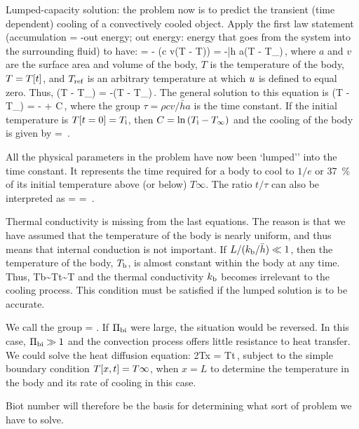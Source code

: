 Lumped-capacity solution: the problem now is to predict the transient (time dependent) cooling of a convectively cooled object. Apply the first law statement (accumulation = -out energy; out energy: energy that goes from the system into the surrounding fluid) to have:
\beq
\dt\ien = -\flux\implies
{}\left(\rho c v\left(T - T\right)\right) = -\bar h a\left(T - T_\infty\right)\,,
\eeq
where $a$ and $v$ are the surface area and volume of the body, $T$ is the temperature of the body, $T = T\!\left[{t}\right]$, and $T_\text{ref}$ is an arbitrary temperature at which $u$ is defined to equal zero. Thus,
\beq
{}\left(T - T_\infty\right) = -\left(T - T_\infty\right)\,.
\eeq
The general solution to this equation is
\beq
\ln\left(T - T_\infty\right) = - + C\,,
\eeq
where the group $\tau = \rho cv/\bar ha$ is the time constant. If the initial temperature is $T\!\left[{t = 0}\right] = T_\text{i}$, then $C = \ln{\left(T_\text{i} - T_\infty\right)}$ and the cooling of the body is given by
\beq
{} = \exp{}\,.
\eeq

All the physical parameters in the problem have now been `lumped'' into the time constant. It represents the time required for a body to cool to $1/e$ or \SI{37}{\%} of its initial temperature above (or below) $T\infty$. The ratio $t/\tau$ can also be interpreted as
\beq
{} =  
                = \,.
\eeq

\begin{note}
Thermal conductivity is missing from the last equations. The reason is that we have assumed that the temperature of the body is nearly uniform, and thus means that internal conduction is not important. If $L/(k_\text{b}/\bar h)\ll 1$, then the temperature of the body, $T_\text{b}$, is almost constant within the body at any time. Thus,
\beq
{}\implies
T\txt b\sim T\vat t\sim T
\eeq
and the thermal conductivity $k_\text{b}$ becomes irrelevant to the cooling process. This condition must be satisfied if the lumped solution is to be accurate.

We call the group
\beq
{} = \biot
\eeq
{}. If $\Pi_\text{bi}$ were large, the situation would be reversed. In this case, $\Pi_\text{bi}\gg 1$ and the convection process offers little resistance to heat transfer. We could solve the heat diffusion equation:
\beq
\nxpd 2Tx = \xpd Tt\,,
\eeq
subject to the simple boundary condition $T\!\left[{x,t}\right] = T\infty$, when $x = L$ to determine the temperature in the body and its rate of cooling in this case.

Biot number will therefore be the basis for determining what sort of problem we have to solve.
\end{note}


